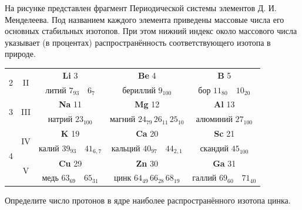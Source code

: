 \begin{taskbasic}[code={\label{task:nuclear_mendeleev_zinc_protons}}]
На рисунке представлен фрагмент Периодической системы элементов Д. И. Менделеева. Под названием каждого элемента приведены массовые числа его основных стабильных изотопов. При этом нижний индекс около массового числа указывает (в процентах) распространённость соответствующего изотопа в природе.

\nopagebreak\smallskip
\begin{center}
\small
\begin{tabular}{|c|c||c|c|c|}
\hline
\multirow{2}{*}{2} & \multirow{2}{*}{II} & \textbf{Li} \hfill 3 & \textbf{Be} \hfill 4 & \textbf{B} \hfill 5 \\
 & & литий $7_{93} \quad 6_7$ & бериллий $9_{100}$ & бор $11_{80} \quad 10_{20}$ \\ \hline
\multirow{2}{*}{3} & \multirow{2}{*}{III} & \textbf{Na} \hfill 11 & \textbf{Mg} \hfill 12 & \textbf{Al} \hfill 13 \\
 & & натрий $23_{100}$ & магний $24_{79} \, 26_{11} \, 25_{10}$ & алюминий $27_{100}$ \\ \hline
\multirow{4}{*}{4} & \multirow{2}{*}{IV} & \textbf{K} \hfill 19 & \textbf{Ca} \hfill 20 & \textbf{Sc} \hfill 21 \\
 & & калий $39_{93} \quad 41_{6,7}$ & кальций $40_{97} \quad 44_{2,1}$ & скандий $45_{100}$ \\ \cline{2-5}
 & \multirow{2}{*}{V} & \textbf{Cu} \hfill 29 & \textbf{Zn} \hfill 30 & \textbf{Ga} \hfill 31 \\
 & & медь $63_{69} \quad 65_{31}$ & цинк $64_{49} \, 66_{28} \, 68_{19}$ & галлий $69_{60} \quad 71_{40}$ \\ \hline
\end{tabular}
\end{center}
\smallskip

Определите число протонов в ядре наиболее распространённого изотопа цинка.

\end{taskbasic}

